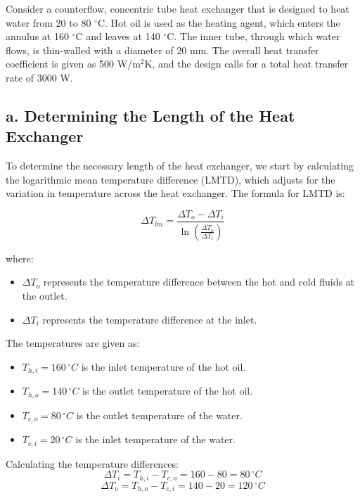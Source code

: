 \documentclass{article}
\numberwithin{equation}{section}
\begin{document}
Consider a counterflow, concentric tube heat exchanger that is designed to heat water from 20 to 80 \( ^{\circ}\)C. Hot oil is used as the heating agent, which enters the annulus at 160 \( ^{\circ}\)C and leaves at 140 \( ^{\circ}\)C. The inner tube, through which water flows, is thin-walled with a diameter of 20 mm. The overall heat transfer coefficient is given as 500 W/m\(^2\)K, and the design calls for a total heat transfer rate of 3000 W.

\subsection*{a. Determining the Length of the Heat Exchanger}

To determine the necessary length of the heat exchanger, we start by calculating the logarithmic mean temperature difference (LMTD), which adjusts for the variation in temperature across the heat exchanger. The formula for LMTD is:

\begin{equation}
\Delta T_{lm} = \frac{\Delta T_{o} - \Delta T_{i}}{\ln\left(\frac{\Delta T_{o}}{\Delta T_{i}}\right)}
\end{equation}

where:
\begin{itemize}
    \item \( \Delta T_{o} \) represents the temperature difference between the hot and cold fluids at the outlet.
    \item \( \Delta T_{i} \) represents the temperature difference at the inlet.
\end{itemize}

The temperatures are given as:
\begin{itemize}
    \item \( T_{h,i} = 160 \, ^{\circ}C \) is the inlet temperature of the hot oil.
    \item \( T_{h,o} = 140 \, ^{\circ}C \) is the outlet temperature of the hot oil.
    \item \( T_{c,o} = 80 \, ^{\circ}C \) is the outlet temperature of the water.
    \item \( T_{c,i} = 20 \, ^{\circ}C \) is the inlet temperature of the water.
\end{itemize}

Calculating the temperature differences:
\begin{equation}
\Delta T_{i} = T_{h,i} - T_{c,o} = 160 - 80 = 80 \, ^{\circ}C
\end{equation}
\begin{equation}
\Delta T_{o} = T_{h,o} - T_{c,i} = 140 - 20 = 120 \, ^{\circ}C
\end{equation}
\end{document}
